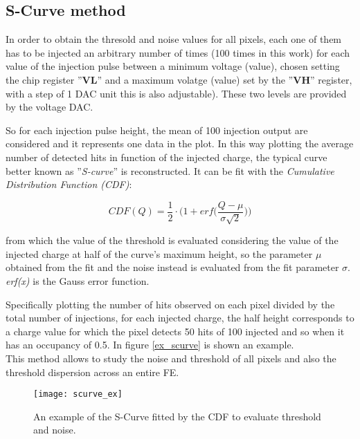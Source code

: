 \subsection{S-Curve method} \label{threshold_subsection}

In order to obtain the thresold and noise values for all pixels, each one of them has to be injected an arbitrary number of times (100 times in this work) for each value of the injection pulse between a minimum voltage (value), chosen setting the chip register ''\textbf{VL}'' and a maximum volatge (value) set by the ''\textbf{VH}'' register, with a step of 1 DAC unit this is also adjustable). These two levels are provided by the voltage DAC.

So for each injection pulse height, the mean of 100 injection output are considered and it represents one data in the plot.  In this way plotting the average number of detected hits in function of the injected charge, the typical curve better known as ''\textit{S-curve}'' is reconstructed. It can be fit with the \textit{Cumulative Distribution Function (CDF)}:

\begin{equation}
 CDF(Q) = \frac{1}{2} \cdot \bigg(1 + \textit{erf}\bigg(\frac{Q-\mu}{\sigma \sqrt{2}}\bigg)\bigg)
\end{equation}

from which the value of the threshold is evaluated considering the value of the injected charge at half of the curve's maximum height, so the parameter $\mu$ obtained from the fit and the noise instead is evaluated from the fit parameter $\sigma$. \textit{erf(x)} is the Gauss error function. 

Specifically plotting the number of hits observed on each pixel divided by the total number of injections, for each injected charge, the half height corresponds to a charge value for which the pixel detects 50 hits of 100 injected and so when it has an occupancy of 0.5. In figure \vref{ex_scurve} is shown an example. \\

This method allows to study the noise and threshold of all pixels and also the threshold dispersion across an entire FE.



\begin{figure}
\centering
\texttt{[image: scurve\_ex]}
\caption{An example of the S-Curve fitted by the CDF to evaluate threshold and noise.}
\label{ex_scurve}
\end{figure}

